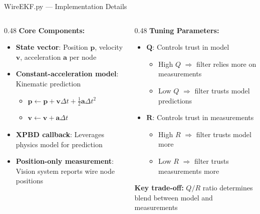 \documentclass[aspectratio=169]{beamer}
\begin{document}
\begin{frame}{WireEKF.py — Implementation Details}

  \small
  \begin{columns}[T]
    \begin{column}{0.48\textwidth}
      \textbf{Core Components:}
      \begin{itemize}
        \item \textbf{State vector}: Position $\mathbf{p}$, velocity $\mathbf{v}$, acceleration $\mathbf{a}$ per node
        \item \textbf{Constant-acceleration model}: Kinematic prediction
          \begin{itemize}
            \item $\mathbf{p} \leftarrow \mathbf{p} + \mathbf{v}\Delta t + \frac{1}{2}\mathbf{a}\Delta t^2$
            \item $\mathbf{v} \leftarrow \mathbf{v} + \mathbf{a}\Delta t$
          \end{itemize}
        \item \textbf{XPBD callback}: Leverages physics model for prediction
        \item \textbf{Position-only measurement}: Vision system reports wire node positions
      \end{itemize}
    \end{column}

    \begin{column}{0.48\textwidth}
      \textbf{Tuning Parameters:}
      \begin{itemize}
        \item $\mathbf{Q}$: Controls trust in model
          \begin{itemize}
            \small
            \item High $Q$ $\Rightarrow$ filter relies more on measurements
            \item Low $Q$ $\Rightarrow$ filter trusts model predictions
          \end{itemize}
        \item $\mathbf{R}$: Controls trust in measurements
          \begin{itemize}
            \small
            \item High $R$ $\Rightarrow$ filter trusts model more
            \item Low $R$ $\Rightarrow$ filter trusts measurements more
          \end{itemize}
      \end{itemize}
      \vspace{0.4em}
      \begin{tcolorbox}[colback=alertred!15, colframe=alertred, arc=3pt, boxrule=0.8pt]
        \textbf{Key trade-off:} $Q/R$ ratio determines blend between model and measurements
      \end{tcolorbox}
    \end{column}
  \end{columns}

\end{frame}
\end{document}
